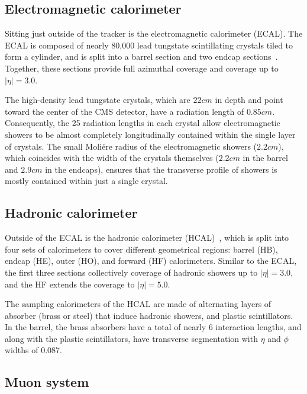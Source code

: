 
\subsection{Electromagnetic calorimeter}

Sitting just outside of the tracker is the electromagnetic calorimeter (ECAL).
The ECAL is composed of nearly 80,000 lead tungstate scintillating crystals tiled to form a cylinder,
and is split into a barrel section and two endcap sections~\cite{CMS:Khachatryan2015hwa}.
Together, these sections provide full azimuthal coverage and coverage up to $|\eta|=3.0$.

The high-density lead tungstate crystals, which are $22\unit{cm}$ in depth
and point toward the center of the CMS detector,
have a radiation length of $0.85\unit{cm}$. Consequently, the 25 radiation
lengths in each crystal allow electromagnetic showers to be almost completely
longitudinally contained within the single layer of crystals. The small
Moli\'ere radius of the electromagnetic showers ($2.2\unit{cm}$), 
which coincides with the
width of the crystals themselves ($2.2\unit{cm}$ in the barrel and
$2.9\unit{cm}$ in the endcaps), ensures that the transverse profile of
showers is mostly contained within just a single crystal.

\subsection{Hadronic calorimeter}

Outside of the ECAL is the hadronic calorimeter (HCAL)~\cite{CMS:PTDR2},
which is split into four sets of calorimeters to cover different geometrical
regions: barrel (HB), endcap (HE), outer (HO), and forward (HF) calorimeters.
Similar to the ECAL, the first three sections collectively coverage of hadronic showers 
up to $|\eta|=3.0$, and the HF extends the coverage to $|\eta|=5.0$.

The sampling calorimeters of the HCAL are made of alternating layers of
absorber (brass or steel) that induce hadronic showers, and plastic
scintillators. In the barrel, the brass absorbers have a total of nearly 6
interaction lengths, and along with the plastic scintillators, have
transverse segmentation with $\eta$ and $\phi$ widths of 0.087.

\subsection{Muon system}

